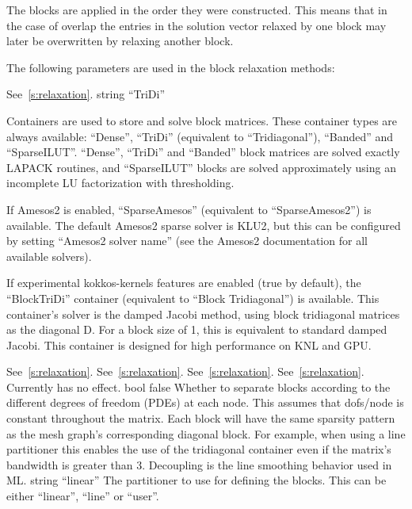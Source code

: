The blocks are applied in the order they were constructed. This means that in
the case of overlap the entries in the solution vector relaxed by one block may
later be overwritten by relaxing another block.

The following parameters are used in the block relaxation methods:

    {See~\ref{s:relaxation}.}
    {string}
    {``TriDi''}
    {Containers are used to store and solve block matrices. These container
     types are always available: ``Dense'', ``TriDi''
     (equivalent to ``Tridiagonal''), ``Banded'' and ``SparseILUT''.
     ``Dense'', ``TriDi'' and ``Banded'' block matrices are
     solved exactly LAPACK routines, and ``SparseILUT'' blocks are solved approximately
     using an incomplete LU factorization with thresholding.

     If Amesos2 is enabled, ``SparseAmesos'' (equivalent to ``SparseAmesos2'') is available.
     The default Amesos2 sparse solver is KLU2, but this can be configured by setting
     ``Amesos2 solver name'' (see the Amesos2 documentation for all available solvers).

     If experimental kokkos-kernels features are enabled (true by default), the ``BlockTriDi''
     container (equivalent to ``Block Tridiagonal'') is available. This container's solver is the damped Jacobi method, using
     block tridiagonal matrices as the diagonal D.
     For a block size of 1, this is equivalent to standard damped Jacobi.
     This container is designed for high performance on KNL and GPU.}
    {See~\ref{s:relaxation}.}
    {See~\ref{s:relaxation}.}
    {See~\ref{s:relaxation}.}
    {See~\ref{s:relaxation}. Currently has no effect. }
    {bool}
    {false}
    {Whether to separate blocks according to the different degrees of
     freedom (PDEs) at each node. This assumes that dofs/node is constant
     throughout the matrix. Each block will have the same sparsity
     pattern as the mesh graph's corresponding diagonal block.
     For example, when using a line partitioner this
     enables the use of the tridiagonal container even if the matrix's
     bandwidth is greater than 3.
     Decoupling is the line smoothing behavior used in ML.}
    {string}
    {``linear''}
    {The partitioner to use for defining the blocks.  This can be either
     ``linear'', ``line'' or ``user''.}
